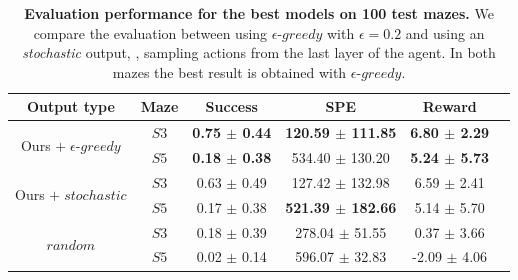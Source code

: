 \begin{table}
    \centering
    \begin{tabular}{c c c c c c}
        \toprule
        Output type                                        & Maze         & Success                  & SPE               & Reward                   \\
        \midrule
        \multirow{2}{*}{Ours $+\; \epsilon\text{-}greedy$} & $S3$ & \textbf{0.75 $\pm$ 0.44} & \textbf{120.59 $\pm$ 111.85} & \textbf{6.80 $\pm$ 2.29} \\
        & $S5$ & \textbf{0.18 $\pm$ 0.38} & 534.40 $\pm$ 130.20          & \textbf{5.24 $\pm$ 5.73} \\

        \multirow{2}{*}{Ours $+\; stochastic$}             & $S3$ & 0.63 $\pm$ 0.49          & 127.42 $\pm$ 132.98          & 6.59 $\pm$ 2.41          \\
        & $S5$ & 0.17 $\pm$ 0.38          & \textbf{521.39 $\pm$ 182.66} & 5.14 $\pm$ 5.70          \\

        \multirow{2}{*}{$random$}                          & $S3$ & 0.18 $\pm$ 0.39          & 278.04 $\pm$ 51.55           & 0.37 $\pm$ 3.66          \\
        & $S5$ & 0.02 $\pm$ 0.14          & 596.07 $\pm$ 32.83           & -2.09 $\pm$ 4.06         \\
        \bottomrule
    \end{tabular}
    \caption{\textbf{Evaluation performance for the best models on 100 test mazes.} We compare the evaluation between using $\epsilon\text{-}greedy$ with $\epsilon=0.2$ and using an \textit{stochastic} output, \ie, sampling actions from the last layer of the agent. In both mazes the best result is obtained with $\epsilon\text{-}greedy$.}
    \label{tab:results-maze}
\end{table}

